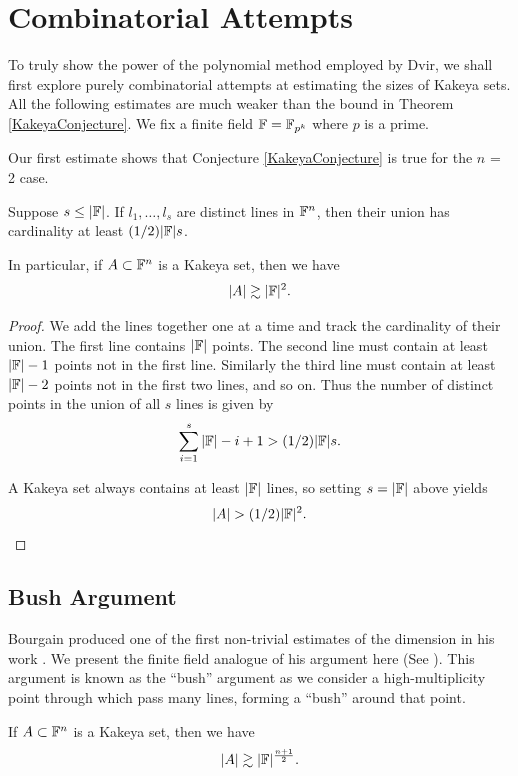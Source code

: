 \section{Combinatorial Attempts}
To truly show the power of the polynomial method employed by Dvir, we shall first explore purely combinatorial attempts 
at estimating the sizes of Kakeya sets. All the following estimates are much weaker than the bound in Theorem \ref{KakeyaConjecture}.
We fix a finite field $\mathbb F = \mathbb F_{p^k}$ where $p$ is a prime. 

Our first estimate shows that Conjecture \ref{KakeyaConjecture} is true for the $n$ = 2 case.

\begin{lemma}
    Suppose $s \leq |\mathbb F|$. If $l_1, \dots, l_s$ are distinct lines in $\mathbb F^n$, then their union has cardinality at least $(1/2)|\mathbb F|s$. \label{lem:kak-first-estimate}

    In particular, if $A \subset \mathbb F^n$ is a Kakeya set, then we have
    \[
      |A| \gtrsim |\mathbb F|^2.
    \] 
\end{lemma} 
\begin{proof}
    We add the lines together one at a time and track the cardinality of their union. The first line contains $|\mathbb F|$ points. The second line must contain at least $|\mathbb F| -1$ points not in the first line. Similarly the third line must contain at least $|\mathbb F| -2$ points not in the first two lines, and so on. Thus the number of distinct points in the union of all $s$ lines is given by
    \[
      \sum_{i=1}^{s} |\mathbb F| - i + 1  > (1/2) |\mathbb F| s.
    \]

    A Kakeya set always contains at least $|\mathbb F|$ lines, so setting $s=|\mathbb F|$ above yields
    \[
        |A| > (1/2) |\mathbb F|^2 .
    \]

\end{proof}

\subsection{Bush Argument} 
Bourgain produced one of the first non-trivial estimates of the dimension in his work \cite{BUSH1991}. We present the finite field analogue of his argument here (See \cite{GUTH2016}). This argument is known as the ``bush'' argument as we consider a high-multiplicity point through which pass many lines, forming a ``bush'' around that point. 


\begin{theorem}
If $A \subset \mathbb F^n$ is a Kakeya set, then we have
$$|A| \gtrsim |\mathbb F|^{\frac{n+1}{2}}.$$
\end{theorem}

